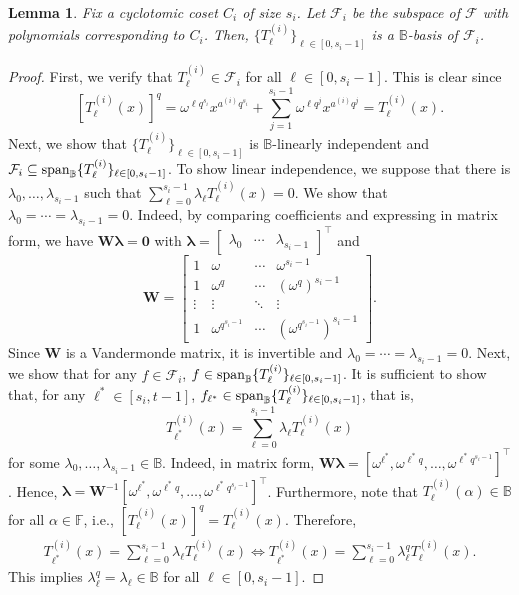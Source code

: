 \documentclass[onecolumn]{IEEEtran}
\theoremstyle{plain}
\newtheorem{lemma}[theorem]{Lemma}
\theoremstyle{definition}
\newcommand{\FF}{\mathbb{F}}
\newcommand{\BB}{\mathbb{B}}
\newcommand{\cF}{\mathcal{F}}
\newcommand{\vspan}{{\rm span}}
\begin{document}
\begin{lemma}\label{lem:basis}
    Fix a cyclotomic coset $C_i$ of size $s_i$. Let $\cF_i$ be the subspace of $\cF$ with polynomials corresponding to $C_i$. Then, $\{T_{\ell}^{(i)}\}_{\ell\in[0,s_i-1]}$ is a $\BB$-basis of $\cF_i$.
\end{lemma}
\begin{proof}
    First, we verify that $T_\ell^{(i)}\in\cF_i$ for all $\ell\in[0,s_i-1]$. This is clear since
    $$[T_{\ell}^{(i)}(x)]^q = \omega^{\ell q^{s_i}} x^{a^{(i)}q^{s_i}}+\sum_{j=1}^{s_i-1}\omega^{\ell q^j}x^{a^{(i)}q^j} = T_\ell^{(i)}(x).$$
    Next, we show that $\{T_\ell^{(i)}\}_{\ell\in[0,s_i-1]}$ is $\BB$-linearly independent and $\cF_i \subseteq \vspan_{\BB}\{T_\ell^{(i)}\}_{\ell\in[0,s_i-1]} $. To show linear independence, we suppose that there is $\lambda_0,\ldots,\lambda_{s_i-1}$ such that $\sum_{\ell=0}^{s_i-1}\lambda_\ell T_\ell^{(i)}(x) =0$. We show that $\lambda_0=\cdots=\lambda_{s_i-1}=0$. Indeed, by comparing coefficients and expressing in matrix form, we have $\boldsymbol{W}\boldsymbol{\lambda} = \boldsymbol{0}$ with $\boldsymbol{\lambda} = \begin{bmatrix}
        \lambda_0& \cdots & \lambda_{s_i-1}
    \end{bmatrix}^\top$ and
    $$
    \boldsymbol{W} = \begin{bmatrix}
    1 & \omega  & \cdots & \omega^{s_i-1}\\
    1 & \omega^q  & \cdots & (\omega^{q})^{s_i-1}\\
    \vdots & \vdots  &\ddots & \vdots\\
    1 & \omega^{q^{s_i-1}} & \cdots & (\omega^{q^{s_i-1}})^{s_i-1} 
\end{bmatrix}.
    $$
    Since $\boldsymbol{W}$ is a Vandermonde matrix, it is invertible and $\lambda_0 = \cdots = \lambda_{s_i-1}=0$. Next, we show that for any $f\in\cF_{i}$, $f\in\vspan_{\BB}\{T_{\ell}^{(i)}\}_{\ell\in[0,s_i-1]}$. It is sufficient to show that, for any $\ell^*\in[s_i,t-1]$, $f_{\ell^*}\in\vspan_{\BB}\{T_{\ell}^{(i)}\}_{\ell\in[0,s_i-1]}$, that is,
    $$
T_{\ell^*}^{(i)}(x) = \sum_{\ell=0}^{s_i-1} \lambda_\ell T_\ell^{(i)}(x)
$$
for some $\lambda_0,\ldots,\lambda_{s_i-1}\in\BB$. Indeed, in matrix form, $\boldsymbol{W\lambda} = [\omega^{\ell^*},\omega^{\ell^{*}q},\ldots,\omega^{\ell^* q^{s_i-1}}]^\top$. Hence, $\boldsymbol{\lambda}=\boldsymbol{W}^{-1}[\omega^{\ell^*},\omega^{\ell^{*}q},\ldots,\omega^{\ell^* q^{s_i-1}}]^\top$. Furthermore, note that $T_\ell^{(i)}(\alpha)\in\BB$ for all $\alpha\in\FF$, i.e., $[T_\ell^{(i)}(x)]^q = T_\ell^{(i)}(x)$. Therefore,
\begin{align*}
    T_{\ell^*}^{(i)}(x) = \sum_{\ell=0}^{s_i-1} \lambda_\ell T_\ell^{(i)}(x) \iff T_{\ell^*}^{(i)}(x) = \sum_{\ell=0}^{s_i-1} \lambda_\ell^q T_\ell^{(i)}(x).
\end{align*}
This implies $\lambda_\ell^q = \lambda_\ell\in\BB$ for all $\ell\in[0,s_i-1]$.
\end{proof}
\end{document}
